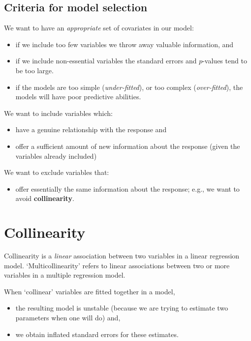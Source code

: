 \documentclass[
  oneside]{krantz}
\providecommand{\tightlist}{%
  \setlength{\itemsep}{0pt}\setlength{\parskip}{0pt}}
\begin{document}
\hypertarget{criteria-for-model-selection}{%
\subsection{Criteria for model selection}\label{criteria-for-model-selection}}

We want to have an \emph{appropriate} set of covariates in our model:

\begin{itemize}
\tightlist
\item
  if we include too few variables we throw away valuable information, and
\item
  if we include non-essential variables the standard errors and \(p\)-values tend to be too large.
\item
  if the models are too simple (\emph{under-fitted}), or too complex (\emph{over-fitted}), the models will have poor predictive abilities.
\end{itemize}

We want to include variables which:

\begin{itemize}
\tightlist
\item
  have a genuine relationship with the response and
\item
  offer a sufficient amount of new information about the response (given the variables already included)
\end{itemize}

We want to exclude variables that:

\begin{itemize}
\tightlist
\item
  offer essentially the same information about the response; e.g., we want to avoid \textbf{collinearity}.
\end{itemize}

\hypertarget{collinearity}{%
\section{Collinearity}\label{collinearity}}

Collinearity is a \emph{linear} association between two variables in a linear regression model. `Multicollinearity' refers to linear associations between two or more variables in a multiple regression model.

When `collinear' variables are fitted together in a model,

\begin{itemize}
\tightlist
\item
  the resulting model is unstable (because we are trying to estimate two parameters when one will do) and,
\item
  we obtain inflated standard errors for these estimates.
\end{itemize}
\end{document}
